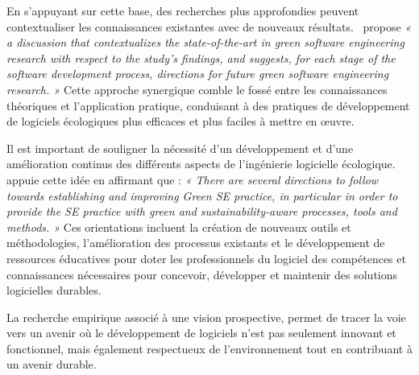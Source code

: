En s'appuyant sur cette base, des recherches plus approfondies peuvent contextualiser les connaissances existantes avec de nouveaux résultats.~\cite{EmpiricalStudy} propose \emph{« a discussion that contextualizes the state-of-the-art in green software engineering research with respect to the study’s findings, and suggests, for each stage of the software development process, directions for future green software engineering research. »} Cette approche synergique comble le fossé entre les connaissances théoriques et l'application pratique, conduisant à des pratiques de développement de logiciels écologiques plus efficaces et plus faciles à mettre en œuvre.


Il est important de souligner la nécessité d'un développement et d'une amélioration continus des différents aspects de l'ingénierie logicielle écologique.~\cite{GreenSustainableEngMapping} appuie cette idée en affirmant que : \emph{« There are several directions to follow towards establishing and improving Green SE practice, in particular in order to provide the SE practice with green and sustainability-aware processes, tools and methods. »} Ces orientations incluent la création de nouveaux outils et méthodologies, l'amélioration des processus existants et le développement de ressources éducatives pour doter les professionnels du logiciel des compétences et connaissances nécessaires pour concevoir, développer et maintenir des solutions logicielles durables.


La recherche empirique associé à une vision prospective, permet de tracer la voie vers un avenir où le développement de logiciels n'est pas seulement innovant et fonctionnel, mais également respectueux de l'environnement tout en contribuant à un avenir durable.


